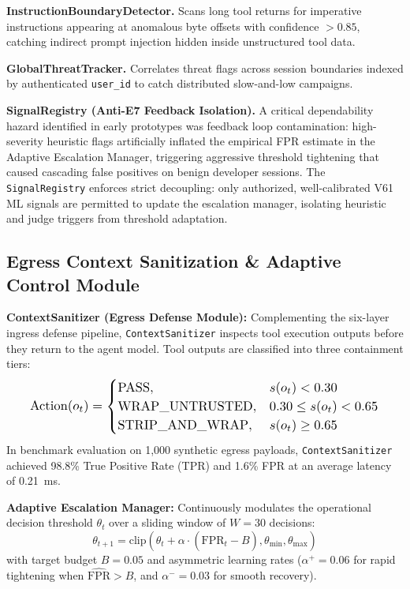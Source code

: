 \documentclass[conference]{IEEEtran}
\begin{document}
\textbf{InstructionBoundaryDetector.} Scans long tool returns for imperative instructions appearing at anomalous byte offsets with confidence $>0.85$, catching indirect prompt injection hidden inside unstructured tool data.

\textbf{GlobalThreatTracker.} Correlates threat flags across session boundaries indexed by authenticated \texttt{user\_id} to catch distributed slow-and-low campaigns.

\textbf{SignalRegistry (Anti-E7 Feedback Isolation).} A critical dependability hazard identified in early prototypes was feedback loop contamination: high-severity heuristic flags artificially inflated the empirical FPR estimate in the Adaptive Escalation Manager, triggering aggressive threshold tightening that caused cascading false positives on benign developer sessions. The \texttt{SignalRegistry} enforces strict decoupling: only authorized, well-calibrated V61 ML signals are permitted to update the escalation manager, isolating heuristic and judge triggers from threshold adaptation.

\subsection{Egress Context Sanitization \& Adaptive Control Module}
\textbf{ContextSanitizer (Egress Defense Module):} Complementing the six-layer ingress defense pipeline, \texttt{ContextSanitizer} inspects tool execution outputs before they return to the agent model. Tool outputs are classified into three containment tiers:
\begin{equation}
\resizebox{0.92\columnwidth}{!}{$
\text{Action}(o_t) = 
\begin{cases}
\text{PASS}, & s(o_t) < 0.30 \\
\text{WRAP\_UNTRUSTED}, & 0.30 \leq s(o_t) < 0.65 \\
\text{STRIP\_AND\_WRAP}, & s(o_t) \geq 0.65
\end{cases}
$}
\end{equation}
In benchmark evaluation on 1,000 synthetic egress payloads, \texttt{ContextSanitizer} achieved 98.8\% True Positive Rate (TPR) and 1.6\% FPR at an average latency of 0.21~ms.

\textbf{Adaptive Escalation Manager:} Continuously modulates the operational decision threshold $\theta_t$ over a sliding window of $W = 30$ decisions:
\begin{equation}
\theta_{t+1} = \text{clip}\left(\theta_t + \alpha \cdot (\widehat{\text{FPR}}_t - B), \theta_{\min}, \theta_{\max}\right)
\end{equation}
with target budget $B = 0.05$ and asymmetric learning rates ($\alpha^+ = 0.06$ for rapid tightening when $\widehat{\text{FPR}} > B$, and $\alpha^- = 0.03$ for smooth recovery).
\end{document}
